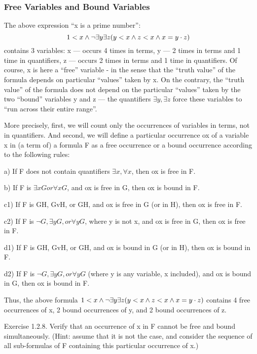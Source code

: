 \subsubsection{Free Variables and Bound Variables}

The above expression ``x is a prime number'':
\[
1<x \wedge  \neg \exists y\exists z(y<x \wedge  z<x \wedge  x=y\cdot z)
\]
contains 3 variables: x --- occurs 4 times in terms, y --- 2 times in terms and 1 time in quantifiers, z --- occurs 2 times in terms and 1 time in quantifiers. Of course, x is here a ``free'' variable - in the sense that the ``truth value'' of the formula depends on particular ``values'' taken by x. On the contrary, the ``truth value'' of the formula does not depend on the particular ``values'' taken by the two ``bound'' variables y and z --- the quantifiers \(\exists y, \exists z\) force these variables to ``run across their entire range''.

More precisely, first, we will count only the occurrences of variables in terms, not in quantifiers. And second, we will define a particular occurrence ox of a variable x in (a term of) a formula F as a free occurrence or a bound occurrence according to the following rules:

a) If F does not contain quantifiers \(\exists x, \forall x\), then ox is free in F.

b) If F is \(\exists xG or \forall xG\), and ox is free in G, then ox is bound in F.

c1) If F is G\AND H, GvH, or G\IMPLIES H, and ox is free in G (or in H), then ox is free in F.

c2) If F is \(\neg G, \exists yG, or \forall yG\), where y is not x, and ox is free in G, then ox is free in F.

d1) If F is G\AND H, GvH, or G\IMPLIES H, and ox is bound in G (or in H), then ox is bound in F.

d2) If F is \(\neg G, \exists yG, or \forall yG\) (where y is any variable, x included), and ox is bound in G, then ox is bound in F.

Thus, the above formula \(1<x \wedge  \neg \exists y\exists z(y<x \wedge  z<x \wedge  x=y\cdot z)\) contains 4 free occurrences of x, 2 bound occurrences of y, and 2 bound occurrences of z.

Exercise 1.2.8. Verify that an occurrence of x in F cannot be free and bound simultaneously. (Hint: assume that it is not the case, and consider the sequence of all sub-formulas of F containing this particular occurrence of x.)


